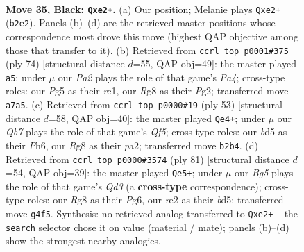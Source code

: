 \documentclass[11pt]{article}
\begin{document}
\clearpage

\begin{figure}[p]\centering
\begin{subfigure}{0.46\textwidth}\centering
\resizebox{\linewidth}{!}{%
\newchessgame
\chessboard[
  setfen={5kr1/p4p2/7p/2PBp1p1/6b1/8/Pq2R3/3K4 b - - 4 35},
  showmover=false,
  pgfstyle=straightmove, color=movearrow, markmove={b2-e2}
]}
\caption{}
\end{subfigure}\hfill
\begin{subfigure}{0.46\textwidth}\centering
\resizebox{\linewidth}{!}{%
\newchessgame
\chessboard[
  setfen={4r3/5k2/5b1p/5Qp1/P6P/8/1P3PPK/2r5 w - - 5 38},
  showmover=false,
  pgfstyle=straightmove, color=movearrow, markmove={a4-a5}
]}
\caption{}
\end{subfigure}
\\[4pt]
\begin{subfigure}{0.46\textwidth}\centering
\resizebox{\linewidth}{!}{%
\newchessgame
\chessboard[
  setfen={8/p1R2Rpk/1p5p/8/5q2/7P/PP3PK1/8 b - - 0 27},
  showmover=false,
  pgfstyle=straightmove, color=movearrow, markmove={f4-e4}
]}
\caption{}
\end{subfigure}\hfill
\begin{subfigure}{0.46\textwidth}\centering
\resizebox{\linewidth}{!}{%
\newchessgame
\chessboard[
  setfen={8/p6p/3q2pP/3B1pk1/8/1pR5/1P2K1P1/3R4 b - - 6 41},
  showmover=false,
  pgfstyle=straightmove, color=movearrow, markmove={d6-e5}
]}
\caption{}
\end{subfigure}
\caption{\textbf{Move 35, Black: \texttt{Qxe2+}.} (a) Our position; Melanie plays \texttt{Qxe2+} (\texttt{b2e2}). Panels (b)--(d) are the retrieved master positions whose correspondence most drove this move (highest QAP objective among those that transfer to it). (b) Retrieved from \texttt{ccrl\_top\_p0001\#375} (ply 74) [structural distance $d$=55, QAP obj=49]: the master played \texttt{a5}; under $\mu$ our \emph{Pa2} plays the role of that game's \emph{Pa4}; cross-type roles: our \emph{P}g5 as their \emph{r}c1, our \emph{R}g8 as their \emph{P}g2; transferred move \texttt{a7a5}. (c) Retrieved from \texttt{ccrl\_top\_p0000\#19} (ply 53) [structural distance $d$=58, QAP obj=40]: the master played \texttt{Qe4+}; under $\mu$ our \emph{Qb7} plays the role of that game's \emph{Qf5}; cross-type roles: our \emph{b}d5 as their \emph{P}h6, our \emph{R}g8 as their \emph{p}a2; transferred move \texttt{b2b4}. (d) Retrieved from \texttt{ccrl\_top\_p0000\#3574} (ply 81) [structural distance $d$=54, QAP obj=39]: the master played \texttt{Qe5+}; under $\mu$ our \emph{Bg5} plays the role of that game's \emph{Qd3} (a \textbf{cross-type} correspondence); cross-type roles: our \emph{R}g8 as their \emph{P}g6, our \emph{r}e2 as their \emph{b}d5; transferred move \texttt{g4f5}. Synthesis: no retrieved analog transferred to \texttt{Qxe2+} -- the \texttt{search} selector chose it on value (material / mate); panels (b)--(d) show the strongest nearby analogies.}
\label{fig:thought-m69}
\end{figure}
\end{document}

